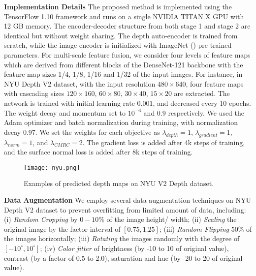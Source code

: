 \documentclass[letterpaper]{article} \usepackage{aaai20}  \usepackage{times}  \usepackage{helvet} \usepackage{courier}  \usepackage{graphicx} \frenchspacing  \setlength{\pdfpagewidth}{8.5in}  \setlength{\pdfpageheight}{11in}  \usepackage{epsfig}
\begin{document}
    \textbf{Implementation Details} \hspace{0.3cm} The proposed method is implemented using the TensorFlow 1.10 framework and runs on a single NVIDIA TITAN X GPU with 12 GB memory. The encoder-decoder structure from both stage 1 and stage 2 are identical but without weight sharing. The depth auto-encoder is trained from scratch, while the image encoder is initialized with ImageNet (\cite{Olga2015ImageNet}) pre-trained parameters. For multi-scale feature fusion, we consider four levels of feature maps which are derived from different blocks of the DenseNet-121 backbone with the feature map sizes 1/4, 1/8, 1/16 and 1/32 of the input images. For instance, in NYU Depth V2 dataset, with the input resolution $480 \times 640$, four feature maps with cascading sizes $120\times160$, $60\times80$, $30\times40$, $15\times20$ are extracted.
    The network is trained with initial learning rate $0.001$, and decreased every 10 epochs. The weight decay and momentum set to $10^{-6}$ and $0.9$ respectively. We used the Adam optimizer and batch normalization during training, with normalization decay 0.97. We set the weights for each objective as $\lambda_{depth}=1$, $\lambda_{gradient}=1$, $\lambda_{norm}=1$, and $\lambda_{CMRC}=2$. The gradient loss is added after 4k steps of training, and the surface normal loss is added after 8k steps of training.  
    \begin{figure*}[t]
    \begin{center}
    \texttt{[image: nyu.png]}
    \end{center}
    \vspace{-15pt}
       \caption{Examples of predicted depth maps on NYU V2 Depth dataset.}
       \vspace{-8pt}
    \label{fig:NYU Depth V2}
    \end{figure*}
    
    \textbf{Data Augmentation} \hspace{0.3cm} We employ several data augmentation techniques on NYU Depth V2 dataset to prevent overfitting from limited amount of data, including: (i) \textit{Random Cropping} by $0-10\%$ of the image height/ width; (ii) \textit{Scaling} the original image by the factor interval of $[0.75, 1.25]$; (iii) 
    \textit{Random Flipping} $50\%$ of the images horizontally; (iii) \textit{Rotating} the images randomly with the degree of $[-10^\circ, 10^\circ]$; (iv) \textit{Color jitter} of brightness (by -10 to 10 of original value), contrast (by a factor of 0.5 to 2.0), saturation and hue (by -20 to 20 of original value). 
    
\end{document}
